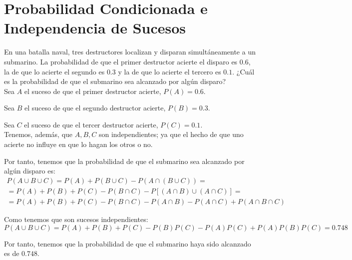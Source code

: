 \section{Probabilidad Condicionada e
Independencia de Sucesos}



\begin{ejercicio} \label{ej:4.Ejercicio1}
    En una batalla naval, tres destructores localizan y disparan simultáneamente a un submarino. La probabilidad de que el primer destructor acierte el disparo es $0.6$, la de que lo acierte el segundo es $0.3$ y la de que lo acierte el tercero es $0.1$. ¿Cuál es la probabilidad de que el submarino sea alcanzado por algún disparo?\\

    Sea $A$ el suceso de que el primer destructor acierte, $P(A)=0.6$.
    
    Sea $B$ el suceso de que el segundo destructor acierte, $P(B)=0.3$.
    
    Sea $C$ el suceso de que el tercer destructor acierte, $P(C)=0.1$.\\

    Tenemos, además, que $A,B,C$ son independientes; ya que el hecho de que uno acierte no influye en que lo hagan los otros o no.

    Por tanto, tenemos que la probabilidad de que el submarino sea alcanzado por algún disparo es:
    \begin{multline*}
        P(A\cup B \cup C)
        = P(A)+P(B\cup C) -P(A\cap (B\cup C)) =\\= P(A) +P(B) + P(C) -P(B\cap C) -P[(A\cap B) \cup (A\cap C)]
        =\\=
        P(A) +P(B) + P(C) -P(B\cap C) -P(A\cap B) -P(A\cap C) +P(A\cap B \cap C)
    \end{multline*}

    Como tenemos que son sucesos independientes:
    \begin{equation*}
        P(A\cup B \cup C) = P(A) +P(B)+P(C)-P(B)P(C)-P(A)P(C)+P(A)P(B)P(C) = 0.748
    \end{equation*}

    Por tanto, tenemos que la probabilidad de que el submarino haya sido alcanzado es de $0.748$.
\end{ejercicio}

